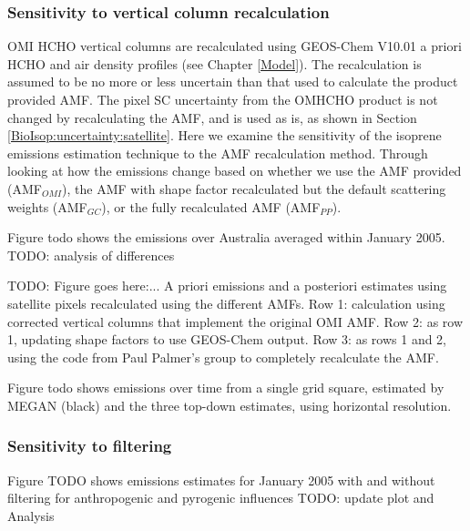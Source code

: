     
    \subsubsection{Sensitivity to vertical column recalculation}
      \label{BioIsop:uncertainty:satellite:AMF}
      OMI HCHO vertical columns are recalculated using GEOS-Chem V10.01 a priori HCHO and air density profiles (see Chapter \ref{Model}).
      The recalculation is assumed to be no more or less uncertain than that used to calculate the product provided AMF.
      The pixel SC uncertainty from the OMHCHO product is not changed by recalculating the AMF, and is used as is, as shown in Section \ref{BioIsop:uncertainty:satellite}.
      Here we examine the sensitivity of the isoprene emissions estimation technique to the AMF recalculation method.
      Through looking at how the emissions change based on whether we use the AMF provided (AMF$_{OMI}$), the AMF with shape factor recalculated but the default scattering weights (AMF$_{GC}$), or the fully recalculated AMF (AMF$_{PP}$).
      
      Figure todo shows the emissions over Australia averaged within January 2005.
      TODO: analysis of differences
      
      
      TODO: Figure goes here:... 
      A priori emissions and a posteriori estimates using satellite pixels recalculated using the different AMFs.
      Row 1: calculation using corrected vertical columns that implement the original OMI AMF.
      Row 2: as row 1, updating shape factors to use GEOS-Chem output.
      Row 3: as rows 1 and 2, using the code from Paul Palmer's group to completely recalculate the AMF.
      
      
      Figure todo shows emissions over time from a single grid square, estimated by MEGAN (black) and the three top-down estimates, using \lowhr horizontal resolution.
  
    \subsubsection{Sensitivity to filtering}
    \label{BioIsop:uncertainty:satellite:fire_filter}
    
    Figure TODO shows emissions estimates for January 2005 with and without filtering for anthropogenic and pyrogenic influences
    TODO: update plot and Analysis
    
    
